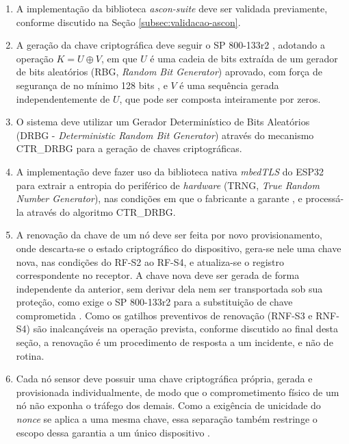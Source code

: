 \begin{enumerate}
    \item[RF-S1.] A implementação da biblioteca \textit{ascon-suite} deve ser validada previamente, conforme discutido na Seção \ref{subsec:validacao-ascon}.

    \item[RF-S2.] A geração da chave criptográfica deve seguir o SP 800-133r2 \cite{barker2020nist133}, adotando a operação $K = U \oplus V$, em que $U$ é uma cadeia de bits extraída de um gerador de bits aleatórios (RBG, \textit{Random Bit Generator}) aprovado, com força de segurança de no mínimo 128 bits \cite{nist800232}, e $V$ é uma sequência gerada independentemente de $U$, que pode ser composta inteiramente por zeros.

    \item[RF-S3.] O sistema deve utilizar um Gerador Determinístico de Bits Aleatórios (DRBG - \textit{Deterministic Random Bit Generator}) através do mecanismo CTR\_DRBG para a geração de chaves criptográficas.

    \item[RF-S4.] A implementação deve fazer uso da biblioteca nativa \textit{mbedTLS} do ESP32 para extrair a entropia do periférico de \textit{hardware} (TRNG, \textit{True Random Number Generator}), nas condições em que o fabricante a garante \cite{espressif2026random}, e processá-la através do algoritmo CTR\_DRBG.

    \item[RF-S5.] A renovação da chave de um nó deve ser feita por novo provisionamento, onde descarta-se o estado criptográfico do dispositivo, gera-se nele uma chave nova, nas condições do RF-S2 ao RF-S4, e atualiza-se o registro correspondente no receptor. A chave nova deve ser gerada de forma independente da anterior, sem derivar dela nem ser transportada sob sua proteção, como exige o SP 800-133r2 para a substituição de chave comprometida \cite{barker2020nist133}. Como os gatilhos preventivos de renovação (RNF-S3 e RNF-S4) são inalcançáveis na operação prevista, conforme discutido ao final desta seção, a renovação é um procedimento de resposta a um incidente, e não de rotina.

    \item[RF-S6.] Cada nó sensor deve possuir uma chave criptográfica própria, gerada e provisionada individualmente, de modo que o comprometimento físico de um nó não exponha o tráfego dos demais. Como a exigência de unicidade do \textit{nonce} se aplica a uma mesma chave, essa separação também restringe o escopo dessa garantia a um único dispositivo \cite{nist800232}.


\end{enumerate}
